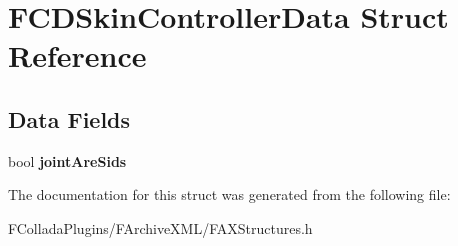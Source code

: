 \hypertarget{structFCDSkinControllerData}{
\section{FCDSkinControllerData Struct Reference}
\label{structFCDSkinControllerData}
}
\subsection*{Data Fields}
\begin{DoxyCompactItemize}
\item 
\hypertarget{structFCDSkinControllerData_ab993b5ac3ec4897455bf8f1263ecc0ae}{
bool {\bfseries jointAreSids}}
\label{structFCDSkinControllerData_ab993b5ac3ec4897455bf8f1263ecc0ae}

\end{DoxyCompactItemize}


The documentation for this struct was generated from the following file:\begin{DoxyCompactItemize}
\item 
FColladaPlugins/FArchiveXML/FAXStructures.h\end{DoxyCompactItemize}

